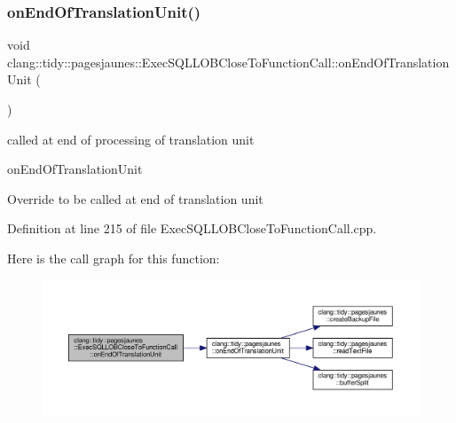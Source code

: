 \subsubsection{\texorpdfstring{on\+End\+Of\+Translation\+Unit()}{onEndOfTranslationUnit()}}
{\footnotesize\ttfamily void clang\+::tidy\+::pagesjaunes\+::\+Exec\+S\+Q\+L\+L\+O\+B\+Close\+To\+Function\+Call\+::on\+End\+Of\+Translation\+Unit (\begin{DoxyParamCaption}{ }\end{DoxyParamCaption})}



called at end of processing of translation unit 

on\+End\+Of\+Translation\+Unit

Override to be called at end of translation unit 

Definition at line 215 of file Exec\+S\+Q\+L\+L\+O\+B\+Close\+To\+Function\+Call.\+cpp.

Here is the call graph for this function\+:
\nopagebreak
\begin{figure}[H]
\begin{center}
\leavevmode
\includegraphics[width=350pt]{classclang_1_1tidy_1_1pagesjaunes_1_1_exec_s_q_l_l_o_b_close_to_function_call_ac67efcc243c9d7907d70c1f01cb08a63_cgraph}
\end{center}
\end{figure}
\mbox{\label{classclang_1_1tidy_1_1pagesjaunes_1_1_exec_s_q_l_l_o_b_close_to_function_call_a229d757dae72929f6282a71940161a6b}} 
